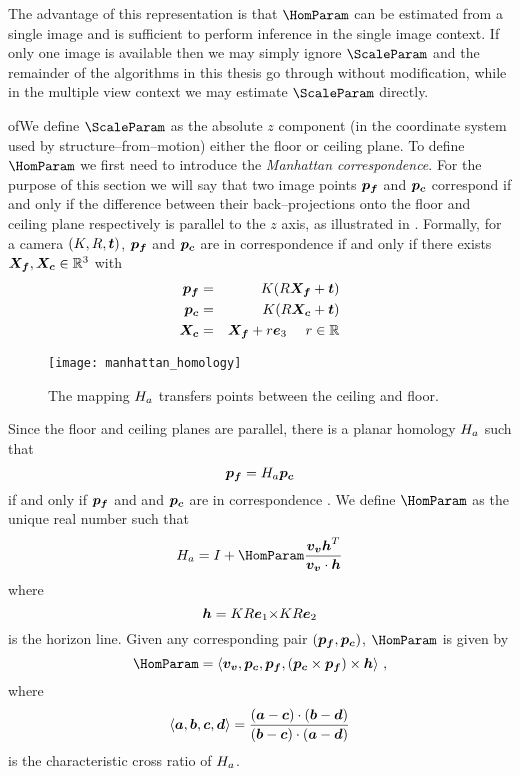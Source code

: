 The advantage of this representation is that $\HomParam$ can be
estimated from a single image and is sufficient to perform inference
in the single image context. If only one image is available then we
may simply ignore $\ScaleParam$ and the remainder of the algorithms in
this thesis go through without modification, while in the multiple
view context we may estimate $\ScaleParam$ directly.

\changedsinceviva of{We define $\ScaleParam$ as the absolute $z$
  component (in the coordinate system used by structure--from--motion)
  either the floor or ceiling plane}. To define $\HomParam$ we first
need to introduce the \textit{Manhattan correspondence}. For the
purpose of this section we will say that two image points $\FloorPt$
and $\CeilPt$ correspond if and only if the difference between their
back--projections onto the floor and ceiling plane respectively is
parallel to the $z$ axis, as illustrated in
. Formally, for a camera $(\CamMatrix,\CamR,\CamTr)$,
$\FloorPt$ and $\CeilPt$ are in correspondence if and only if there
exists $\FloorVec,\CeilVec \in \Rthree$ with
\begin{eqnarray}
  \FloorPt &=& \CamMatrix (\CamR \FloorVec + \CamTr) \\
  \CeilPt &=& \CamMatrix (\CamR \CeilVec + \CamTr) \\
  \CeilVec &=& \FloorVec + r \ez ~~~~ r \in \Reals
\end{eqnarray}

\begin{figure}[tb]
  \centering
  \texttt{[image: manhattan\_homology]}
  \caption{The mapping $\Hcf$ transfers points between the ceiling
    and floor.}
  \label{fig:homology}
\end{figure}

Since the floor and ceiling planes are parallel, there is a planar
homology $\Hcf$ such that
\begin{equation}
  \FloorPt = \Hcf \CeilPt
\end{equation}
if and only if $\pfloor$ and and $\pceil$ are in correspondence
\cite{Criminisi01}. We define $\HomParam$ as the unique real number
such that
\begin{equation}
  \label{eq:manhattanhom}
  \Hcf = I + \HomParam\frac{\vvpt\horizon^T}{\vvpt \cdot \horizon}
\end{equation}
where
\begin{equation}
  \horizon = \CamMatrix\CamR\ex \cross \CamMatrix\CamR\ey
\end{equation}
is the horizon line. Given any corresponding pair
$(\FloorPt,\CeilPt)$, $\HomParam$ is given by \cite{Criminisi01}
\begin{equation}
  \HomParam = 
  \langle\vvpt,\CeilPt,\FloorPt,(\CeilPt\times\FloorPt)\times\horizon\rangle ~,
\end{equation}
where
\begin{equation}
  \langle \vect{a},\vect{b},\vect{c},\vect{d} \rangle = \frac{
    (\vect{a}-\vect{c}) \cdot (\vect{b}-\vect{d})
  }{
    (\vect{b}-\vect{c}) \cdot (\vect{a}-\vect{d})
  }
\end{equation}
is the characteristic cross ratio of $\Hcf$.

